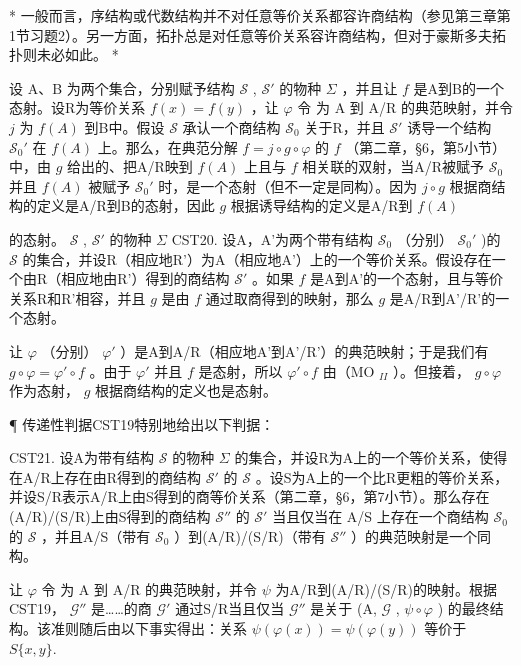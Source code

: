 * 一般而言，序结构或代数结构并不对任意等价关系都容许商结构（参见第三章第1节习题2）。另一方面，拓扑总是对任意等价关系容许商结构，但对于豪斯多夫拓扑则未必如此。 *

设 A、B 为两个集合，分别赋予结构 \(\mathcal{S}\) , \(\mathcal{S}'\) 的物种 \(\Sigma\) ，并且让 \(f\) 是A到B的一个态射。设R为等价关系 \(f(x) = f(y)\) ，让 \(\varphi\) 令 为 A 到 A/R 的典范映射，并令 \(j\) 为 \(f(A)\) 到B中。假设 \(\mathcal{S}\) 承认一个商结构 \(\mathcal{S}_0\) 关于R，并且 \(\mathcal{S}'\) 诱导一个结构 \(\mathcal{S}_0'\) 在 \(f(A)\) 上。那么，在典范分解 \(f = j \circ g \circ \varphi\) 的 \(f\) （第二章，§6，第5小节）中，由 \(g\) 给出的、把A/R映到 \(f(A)\) 上且与 \(f\) 相关联的双射，当A/R被赋予 \(\mathcal{S}_0\) 并且 \(f(A)\) 被赋予 \(\mathcal{S}_0'\) 时，是一个态射（但不一定是同构）。因为 \(j \circ g\) 根据商结构的定义是A/R到B的态射，因此 \(g\) 根据诱导结构的定义是A/R到 \(f(A)\)

的态射。 \(\mathcal{S}\) , \(\mathcal{S}'\) 的物种 \(\Sigma\) CST20. 设A，A'为两个带有结构 \(\mathcal{S}_0\) （分别） \(\mathcal{S}_0'\) )的 \(\mathcal{S}\) 的集合，并设R（相应地R'）为A（相应地A'）上的一个等价关系。假设存在一个由R（相应地由R'）得到的商结构 \(\mathcal{S}'\) 。如果 \(f\) 是A到A'的一个态射，且与等价关系R和R'相容，并且 \(g\) 是由 \(f\) 通过取商得到的映射，那么 \(g\) 是A/R到A'/R'的一个态射。

让 \(\varphi\) （分别） \(\varphi'\) ）是A到A/R（相应地A'到A'/R'）的典范映射；于是我们有 \(g \circ \varphi = \varphi' \circ f\) 。由于 \(\varphi'\) 并且 \(f\) 是态射，所以 \(\varphi' \circ f\) 由（MO \(_{II}\) ）。但接着， \(g \circ \varphi\) 作为态射， \(g\) 根据商结构的定义也是态射。

¶ 传递性判据CST19特别地给出以下判据：

CST21. 设A为带有结构 \(\mathcal{S}\) 的物种 \(\Sigma\) 的集合，并设R为A上的一个等价关系，使得在A/R上存在由R得到的商结构 \(\mathcal{S}'\) 的 \(\mathcal{S}\) 。设S为A上的一个比R更粗的等价关系，并设S/R表示A/R上由S得到的商等价关系（第二章，§6，第7小节）。那么存在(A/R)/(S/R)上由S得到的商结构 \(\mathcal{S}''\) 的 \(\mathcal{S}'\) 当且仅当在 A/S 上存在一个商结构 \(\mathcal{S}_0\) 的 \(\mathcal{S}\) ，并且A/S（带有 \(\mathcal{S}_0\) ）到(A/R)/(S/R)（带有 \(\mathcal{S}''\) ）的典范映射是一个同构。

让 \(\varphi\) 令 为 A 到 A/R 的典范映射，并令 \(\psi\) 为A/R到(A/R)/(S/R)的映射。根据CST19， \(\mathcal{G}''\) 是……的商 \(\mathcal{G}'\) 通过S/R当且仅当 \(\mathcal{G}''\) 是关于 (A, \(\mathcal{G}\) , \(\psi \circ \varphi\) ) 的最终结构。该准则随后由以下事实得出：关系 \(\psi(\varphi(x)) = \psi(\varphi(y))\) 等价于 \(S\{x,y\}\).


